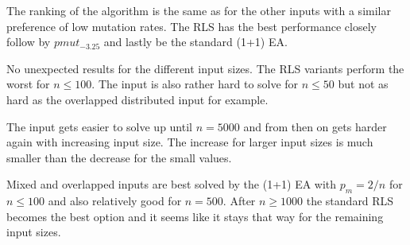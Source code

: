 The ranking of the algorithm is the same as for the other inputs with a similar preference of low mutation rates.
The RLS has the best performance closely follow by $pmut_{-3.25}$ and lastly be the standard (1+1) EA.



No unexpected results for the different input sizes.
The RLS variants perform the worst for $n\le 100$.
The input is also rather hard to solve for $n\le50$ but not as hard as the overlapped distributed input for example.



The input gets easier to solve up until $n=5000$ and from then on gets harder again with increasing input size.
The increase for larger input sizes is much smaller than the decrease for the small values.



Mixed and overlapped inputs are best solved by the (1+1) EA with $p_m=2/n$ for $n\le100$ and also relatively good for $n=500$.
After $n\ge1000$ the standard RLS becomes the best option and it seems like it stays that way for the remaining input sizes.